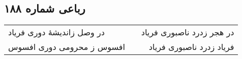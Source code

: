 \begin{center}
\section*{رباعی شماره ۱۸۸}
\label{sec:sh188}
\begin{longtable}{l p{0.5cm} r}
در وصل زاندیشهٔ دوری فریاد
&&
در هجر زدرد ناصبوری فریاد
\\
افسوس ز محرومی دوری افسوس
&&
فریاد زدرد ناصبوری فریاد
\\
\end{longtable}
\end{center}
